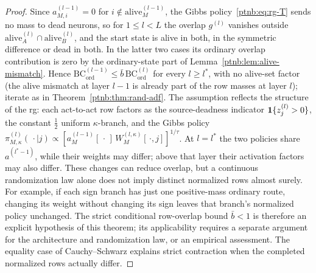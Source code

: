 \begin{proof}
Since $a^{(l-1)}_{M,i} = 0$ for $i \notin \mathrm{alive}^{(l-1)}_M$, the Gibbs
policy~\eqref{ptnb:eq:rg-T} sends no mass to dead neurons, so for $1 \le l < L$ the overlap $g^{(l)}$
vanishes outside $\mathrm{alive}^{(l)}_A \cap \mathrm{alive}^{(l)}_B$, and the start state is alive
in both, in the symmetric difference or dead in both. In the latter two cases its
ordinary overlap contribution is zero by the ordinary-state part of Lemma~\ref{ptnb:lem:alive-mismatch}. Hence
$\mathrm{BC}^{(l-1)}_{\mathrm{ord}} \leq \bar{b}\,\mathrm{BC}^{(l)}_{\mathrm{ord}}$ for every $l
    \geq l^*$, with no alive-set factor (the alive mismatch at layer $l-1$ is already part of the row
masses at layer $l$); iterate as in Theorem~\ref{ptnb:thm:rand-adf}.  The assumption reflects the
structure of the \ac{rg}: each act-to-act row factors as the source-deadness indicator
$\mathbf{1}\{z_j^{(l)} > 0\}$, the constant $\tfrac12$ uniform $\kappa$-branch, and the Gibbs policy
$\pi_{M,\kappa}^{(l)}(\,\cdot\mid j) \propto [a^{(l-1)}_M[\,\cdot\,]\,W^{(l,\kappa)}_M[\,\cdot,
    j]]^{1/\tau}$.  At $l=l^*$ the two policies share $a^{(l^*-1)}$, while their weights may differ; above that layer their activation factors may also differ. These changes can reduce overlap, but a continuous randomization law alone does not imply distinct normalized rows almost surely. For example, if each sign branch has just one positive-mass ordinary route, changing its weight without changing its sign leaves that branch's normalized policy unchanged. The strict conditional row-overlap bound $\bar b<1$ is therefore an explicit hypothesis of this theorem; its applicability requires a separate argument for the architecture and randomization law, or an empirical assessment. The equality case of Cauchy--Schwarz explains strict contraction when the completed normalized rows actually differ.
\end{proof}

